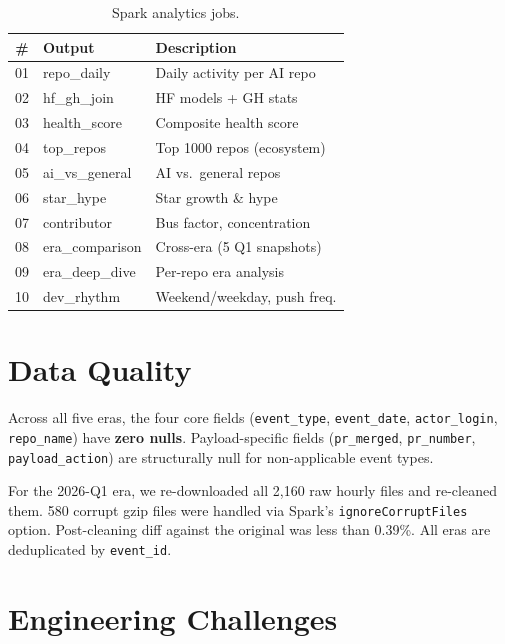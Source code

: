 \documentclass[11pt,twocolumn]{article}
\begin{document}
\begin{table}[t]
\centering\scriptsize
\caption{Spark analytics jobs.}\label{tab:jobs}
\begin{tabular}{@{}clp{2.8cm}@{}}
\toprule
\textbf{\#} & \textbf{Output} & \textbf{Description} \\
\midrule
01 & repo\_daily          & Daily activity per AI repo \\
02 & hf\_gh\_join         & HF models + GH stats \\
03 & health\_score        & Composite health score \\
04 & top\_repos           & Top 1000 repos (ecosystem) \\
05 & ai\_vs\_general      & AI vs.\ general repos \\
06 & star\_hype           & Star growth \& hype \\
07 & contributor          & Bus factor, concentration \\
08 & era\_comparison      & Cross-era (5 Q1 snapshots) \\
09 & era\_deep\_dive      & Per-repo era analysis \\
10 & dev\_rhythm          & Weekend/weekday, push freq. \\
\bottomrule
\end{tabular}
\end{table}

\section{Data Quality}\label{sec:quality}

Across all five eras, the four core fields (\texttt{event\_type}, \texttt{event\_date}, \texttt{actor\_login}, \texttt{repo\_name}) have \textbf{zero nulls}.
Payload-specific fields (\texttt{pr\_merged}, \texttt{pr\_number}, \texttt{payload\_action}) are structurally null for non-applicable event types.

For the 2026-Q1 era, we re-downloaded all 2,160 raw hourly files and re-cleaned them.
580 corrupt gzip files were handled via Spark's \texttt{ignoreCorruptFiles} option.
Post-cleaning diff against the original was less than 0.39\%.
All eras are deduplicated by \texttt{event\_id}.

\section{Engineering Challenges}\label{sec:challenges}
\end{document}
